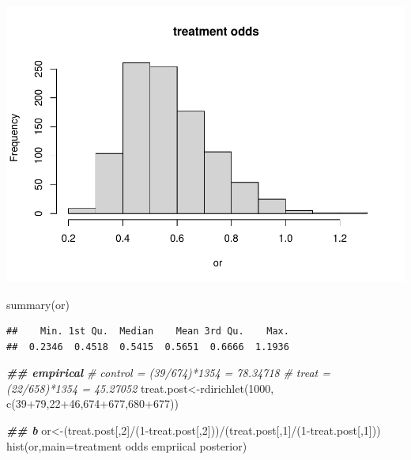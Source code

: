 \documentclass[
]{book}
\newenvironment{Shaded}{\begin{snugshade}}{\end{snugshade}}
\newcommand{\AttributeTok}[1]{\textcolor[rgb]{0.77,0.63,0.00}{#1}}
\newcommand{\CommentTok}[1]{\textcolor[rgb]{0.56,0.35,0.01}{\textit{#1}}}
\newcommand{\DecValTok}[1]{\textcolor[rgb]{0.00,0.00,0.81}{#1}}
\newcommand{\DocumentationTok}[1]{\textcolor[rgb]{0.56,0.35,0.01}{\textbf{\textit{#1}}}}
\newcommand{\FunctionTok}[1]{\textcolor[rgb]{0.00,0.00,0.00}{#1}}
\newcommand{\NormalTok}[1]{#1}
\newcommand{\OtherTok}[1]{\textcolor[rgb]{0.56,0.35,0.01}{#1}}
\newcommand{\SpecialCharTok}[1]{\textcolor[rgb]{0.00,0.00,0.00}{#1}}
\newcommand{\StringTok}[1]{\textcolor[rgb]{0.31,0.60,0.02}{#1}}
\theoremstyle{definition}
\theoremstyle{definition}
\theoremstyle{definition}
\theoremstyle{definition}
\theoremstyle{remark}
\begin{document}
\includegraphics{_main_files/figure-latex/unnamed-chunk-38-1.pdf}

\begin{Shaded}
\begin{Highlighting}[]
  \FunctionTok{summary}\NormalTok{(or)}
\end{Highlighting}
\end{Shaded}

\begin{verbatim}
##    Min. 1st Qu.  Median    Mean 3rd Qu.    Max. 
##  0.2346  0.4518  0.5415  0.5651  0.6666  1.1936
\end{verbatim}

\begin{Shaded}
\begin{Highlighting}[]
  \DocumentationTok{\#\# empirical}
  \CommentTok{\# control = (39/674)*1354 = 78.34718}
  \CommentTok{\# treat = (22/658)*1354 = 45.27052}
\NormalTok{  treat.post}\OtherTok{\textless{}{-}}\FunctionTok{rdirichlet}\NormalTok{(}\DecValTok{1000}\NormalTok{, }\FunctionTok{c}\NormalTok{(}\DecValTok{39}\SpecialCharTok{+}\DecValTok{79}\NormalTok{,}\DecValTok{22}\SpecialCharTok{+}\DecValTok{46}\NormalTok{,}\DecValTok{674}\SpecialCharTok{+}\DecValTok{677}\NormalTok{,}\DecValTok{680}\SpecialCharTok{+}\DecValTok{677}\NormalTok{))}
 
  
  \DocumentationTok{\#\# b}
\NormalTok{  or}\OtherTok{\textless{}{-}}\NormalTok{(treat.post[,}\DecValTok{2}\NormalTok{]}\SpecialCharTok{/}\NormalTok{(}\DecValTok{1}\SpecialCharTok{{-}}\NormalTok{treat.post[,}\DecValTok{2}\NormalTok{]))}\SpecialCharTok{/}\NormalTok{(treat.post[,}\DecValTok{1}\NormalTok{]}\SpecialCharTok{/}\NormalTok{(}\DecValTok{1}\SpecialCharTok{{-}}\NormalTok{treat.post[,}\DecValTok{1}\NormalTok{]))}
  \FunctionTok{hist}\NormalTok{(or,}\AttributeTok{main=}\StringTok{\textquotesingle{}treatment odds empriical posterior\textquotesingle{}}\NormalTok{)}
\end{Highlighting}
\end{Shaded}
\end{document}
